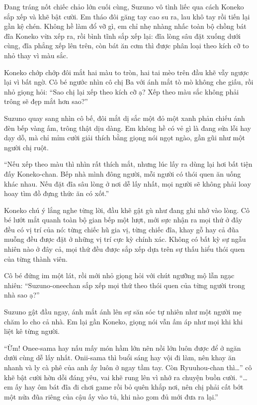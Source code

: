 ﻿\documentclass[../main.tex]{subfiles}
\begin{document}
Đang tráng nốt chiếc chảo lớn cuối cùng, Suzuno vô tình liếc qua cách Koneko sắp xếp và khẽ bật cười. Em tháo đôi găng tay cao su ra, lau khô tay rồi tiến lại gần kệ chén. Không hề làm đổ vỡ gì, em chỉ nhẹ nhàng nhấc toàn bộ chồng bát đĩa Koneko vừa xếp ra, rồi bình tĩnh sắp xếp lại: đĩa lòng sâu đặt xuống dưới cùng, đĩa phẳng xếp lên trên, còn bát ăn cơm thì được phân loại theo kích cỡ to nhỏ thay vì màu sắc.

Koneko chớp chớp đôi mắt hai màu to tròn, hai tai mèo trên đầu khẽ vẫy ngược lại vì bất ngờ. Cô bé ngước nhìn cô chị Ba với ánh mắt tò mò không che giấu, rồi nhỏ giọng hỏi: ``Sao chị lại xếp theo kích cỡ ạ? Xếp theo màu sắc không phải trông sẽ đẹp mắt hơn sao?''

Suzuno quay sang nhìn cô bế, đôi mắt dị sắc một đỏ một xanh phản chiếu ánh đèn bếp vàng ấm, trông thật dịu dàng. Em không hề có vẻ gì là đang sửa lỗi hay dạy dỗ, mà chỉ mỉm cười giải thích bằng giọng nói ngọt ngào, gần gũi như một người chị ruột.

``Nếu xếp theo màu thì nhìn rất thích mắt, nhưng lúc lấy ra dùng lại hơi bất tiện đấy Koneko-chan. Bếp nhà mình đông người, mỗi người có thói quen ăn uống khác nhau. Nếu đặt đĩa sâu lòng ở nơi dễ lấy nhất, mọi người sẽ không phải loay hoay tìm đồ đựng thức ăn có xốt.''

Koneko chú ý lắng nghe từng lời, đầu khẽ gật gù như đang ghi nhớ vào lòng. Cô bé lướt mắt quanh toàn bộ gian bếp một lượt, mới sực nhận ra mọi thứ ở đây đều có vị trí của nó: từng chiếc hũ gia vị, từng chiếc đĩa, khay gỗ hay cả đũa muỗng đều được đặt ở những vị trí cực kỳ chính xác. Không có bất kỳ sự ngẫu nhiên nào ở đây cả, mọi thứ đều được sắp xếp dựa trên sự thấu hiểu thói quen của từng thành viên.

Cô bé đứng im một lát, rồi mới nhỏ giọng hỏi với chút ngưỡng mộ lẫn ngạc nhiên: ``Suzuno-oneechan sắp xếp mọi thứ theo thói quen của từng người trong nhà sao ạ?''

Suzuno gật đầu ngay, ánh mắt ánh lên sự săn sóc tự nhiên như một người mẹ chăm lo cho cả nhà. Em lại gần Koneko, giọng nói vẫn ấm áp như mọi khi khi liệt kê từng người.

``Ừm! Onee-sama hay nấu mấy món hầm lớn nên nồi lớn luôn được để ở ngăn dưới cùng dễ lấy nhất. Onii-sama thì buổi sáng hay vội đi làm, nên khay ăn nhanh và ly cà phê của anh ấy luôn ở ngay tầm tay. Còn Ryuuhou-chan thì\dots'' cô khẽ bật cười hờn dỗi đáng yêu, vai khẽ rung lên vì nhớ ra chuyện buồn cười. ``\dots em ấy hay ôm bát đĩa đi chơi game rồi bỏ quên khắp nơi, nên chị phải cất bớt một nửa đũa riêng của cậu ấy vào tủ, khi nào gom đủ mới đưa ra lại.''
\end{document}
